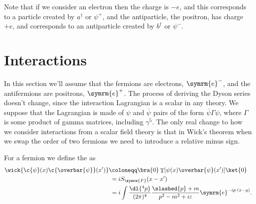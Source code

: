 \documentclass[fleqn]{NotesClass}
\makeatletter
\newcommand{\@particlefont}{\symrm}
\newcommand{\Pe}{\ensuremath{\@particlefont{e}^{-}}}
\newcommand{\APe}{\ensuremath{\@particlefont{e}^{+}}}
\newcommand{\e}{\symrm{e}}
\newcommand{\hermit}{{\dagger}}
\DeclareMathOperator{\timeOrdering}{T}
\newcommand{\feynman}{\symrm{F}}
\newcommand{\diracadjoint}[1]{\overbar{#1}}
\makeatother
\begin{document}
    Note that if we consider an electron then the charge is \(-e\), and this corresponds to a particle created by \(a^\hermit\) or \(\psi^+\), and the antiparticle, the positron, has charge \(+e\), and corresponds to an antiparticle created by \(b^\hermit\) or \(\psi^-\).
    
    \section{Interactions}
    In this section we'll assume that the fermions are electrons, \Pe, and the antifermions are positrons, \APe.
    The process of deriving the Dyson series doesn't change, since the interaction Lagrangian is a scalar in any theory.
    We suppose that the Lagrangian is made of \(\psi\) and \(\diracadjoint{\psi}\) pairs of the form \(\diracadjoint{\psi} \Gamma \psi\), where \(\Gamma\) is some product of gamma matrices, including \(\gamma^5\).
    The only real change to how we consider interactions from a scalar field theory is that in Wick's theorem when we swap the order of two fermions we need to introduce a relative minus sign.
    
    For a fermion we define the  as
    \begin{align}\label{eqn:wick contraction for fermions}
        \wick{\c{\psi}(x) \c{\diracadjoint{\psi}}(x')} &\coloneqq \bra{0} \timeOrdering[\psi(x) \diracadjoint{\psi}(x')] \ket{0}\\
        &\hphantom{:}= iS_{\feynman}(x - x')\\
        &\hphantom{:}= i \int \frac{\dl{^4p}}{(2\pi)^4} \frac{\slashed{p} + m}{p^2 - m^2 + i\varepsilon} \e^{-ip\cdot (x - y)}.
    \end{align}
    
\end{document}
